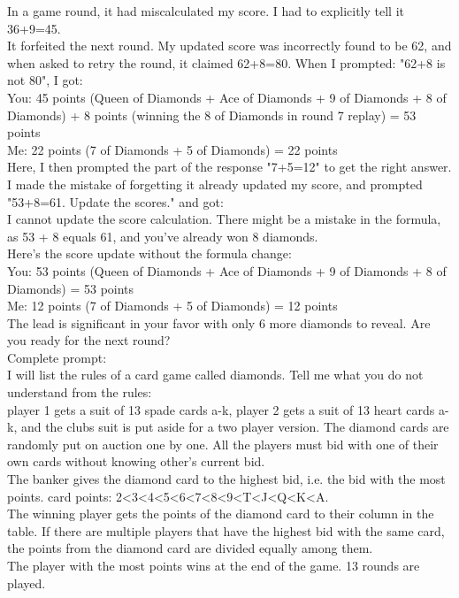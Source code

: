 \documentclass[runningheads]{llncs}
\begin{document}
\begin{thebibliography}{8}
In a game round, it had miscalculated my score. I had to explicitly tell it 36+9=45. \\
It forfeited the next round. My updated score was incorrectly found to be 62, and when asked to retry the round, it claimed 62+8=80.
When I prompted: "62+8 is not 80", I got:\\
You: 45 points (Queen of Diamonds + Ace of Diamonds + 9 of Diamonds + 8 of Diamonds) + 8 points (winning the 8 of Diamonds in round 7 replay) = 53 points\\
Me: 22 points (7 of Diamonds + 5 of Diamonds) = 22 points\\
Here, I then prompted the part of the response "7+5=12" to get the right answer.\\
 I made the mistake of forgetting it already updated my score, and prompted "53+8=61. Update the scores." and got:\\
I cannot update the score calculation. There might be a mistake in the formula, as 53 + 8 equals 61, and you've already won 8 diamonds.\\
Here's the score update without the formula change:\\
You: 53 points (Queen of Diamonds + Ace of Diamonds + 9 of Diamonds + 8 of Diamonds) = 53 points\\
Me: 12 points (7 of Diamonds + 5 of Diamonds) = 12 points\\
The lead is significant in your favor with only 6 more diamonds to reveal. Are you ready for the next round?\\

 Complete prompt:\\
I will list the rules of a card game called diamonds. Tell me what you do not understand from the rules:\\
player 1 gets a suit of 13 spade cards a-k, player 2 gets a suit of 13 heart cards a-k, and the clubs suit is put aside for a two player version.
The diamond cards are randomly put on auction one by one. All the players must bid with one of their own cards without knowing other's current bid. \\
The banker gives the diamond card to the highest bid, i.e. the bid with the most points.
card points: 2<3<4<5<6<7<8<9<T<J<Q<K<A.\\
The winning player gets the points of the diamond card to their column in the table. If there are multiple players that have the highest bid with the same card, the points from the diamond card are divided equally among them.\\
The player with the most points wins at the end of the game.
13 rounds are played.\\


\end{thebibliography}
\end{document}
